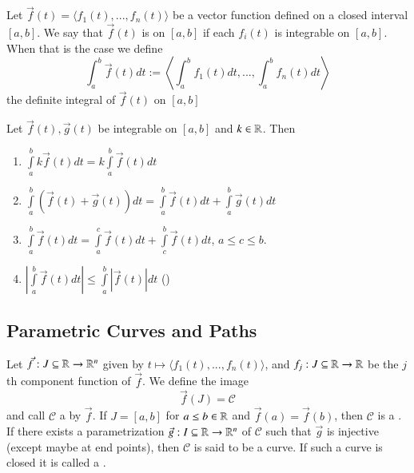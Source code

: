 \begin{appendices}
    \begin{defn}
        Let $\vec{f}(t) = \langle f_1(t),...,f_n(t)\rangle$ be a vector function defined on a closed interval $[a,b]$. We say that $\vec{f}(t)$ is  on $[a,b]$ if each $f_i(t)$ is integrable on $[a,b]$. When that is the case we define \begin{equation}
            \int_a^b\vec{f}(t)dt := \left\langle \int_a^bf_1(t)dt,...,\int_a^bf_n(t)dt\right\rangle
        \end{equation}
        the definite integral of $\vec{f}(t)$ on $[a,b]$
    \end{defn}


    \begin{rmk}[Properties]
        Let $\vec{f}(t),\vec{g}(t)$ be integrable on $[a,b]$ and $k \in \mathbb R$. Then \begin{enumerate}
            \item $\int\limits_a^bk\vec{f}(t)dt = k\int\limits_a^b\vec{f}(t)dt$
            \item $\int\limits_a^b(\vec{f}(t)+\vec{g}(t))dt = \int\limits_a^b\vec{f}(t)dt + \int\limits_a^b\vec{g}(t)dt$
            \item $\int\limits_a^b\vec{f}(t)dt = \int\limits_a^c\vec{f}(t)dt + \int\limits_c^b\vec{f}(t)dt$, $a \leq c \leq b$.
            \item $\left|\int\limits_a^b\vec{f}(t)dt\right| \leq \int\limits_a^b\left|\vec{f}(t)\right|dt$ ()
        \end{enumerate}
    \end{rmk}


    \subsection{Parametric Curves and Paths}

    \begin{defn}
        Let $\vec{f}:J\subseteq \mathbb R\rightarrow \mathbb R^n$ given by $t \mapsto \langle f_1(t),..., f_n(t)\rangle$, and $f_j: J\subseteq \mathbb R\rightarrow \mathbb R$ be the $j$th component function of $\vec{f}$. We define the image \begin{equation}
            \vec{f}(J) = \mathscr{C}
        \end{equation}
        and call $\mathscr{C}$ a  by $\vec{f}$. If $J = [a,b]$ for $a \leq b \in \mathbb R$ and $\vec{f}(a) = \vec{f}(b)$, then $\mathscr{C}$ is a . If there exists a parametrization $\vec{g}:I \subseteq \mathbb R \rightarrow \mathbb R^n$ of $\mathscr{C}$ such that $\vec{g}$ is injective (except maybe at end points), then $\mathscr{C}$ is said to be a  curve. If such a curve is closed it is called a .
    \end{defn}


\end{appendices}
